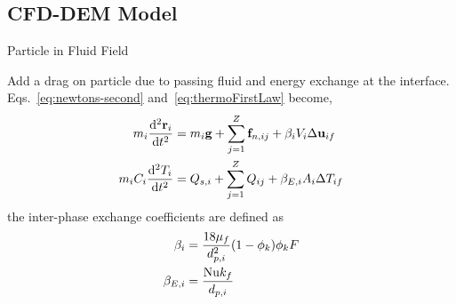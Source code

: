\subsection{CFD-DEM Model}
\begin{frame}{Particle in Fluid Field}

Add a drag on particle due to passing fluid and energy exchange at the interface. Eqs.~\ref{eq:newtons-second} and~\ref{eq:thermoFirstLaw} become,
\begin{subequations}\label{eq:cfdem-dem-momentum}
\begin{align}
	m_i  \frac{\mathrm{d}^2{\mathbf{r}_i}}{\mathrm{d}t^2}  &= m_i\mathbf{g} + \sum_{j=1}^{Z} \mathbf{f}_{n,ij} + \beta_i V_i \Delta \mathbf{u}_{if}\\
	m_iC_i \frac{\mathrm{d}^2{T_i}}{\mathrm{d}t^2} &= Q_{s,i} + \sum_{j=1}^Z Q_{ij} + \beta_{E,i} A_i \Delta T_{if}
\end{align}
\end{subequations}
the inter-phase exchange coefficients are defined as
\begin{subequations}
\begin{align}
	\beta_{i} &= \frac{18\mu_f}{d_{p,i}^2}(1-\phi_k)\phi_k F\\
	\beta_{E,i} &= \frac{\mathrm{Nu} k_f}{d_{p,i}}
\end{align}
\end{subequations}

\end{frame}


